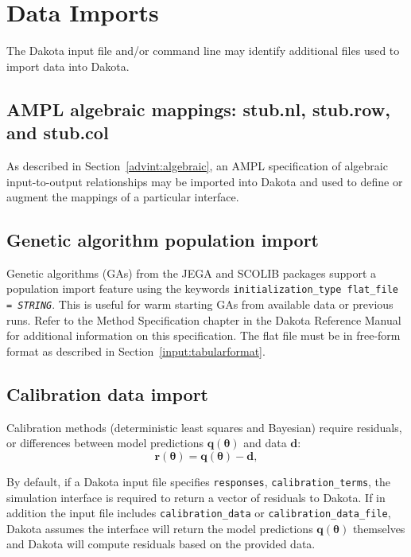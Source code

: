 \section{Data Imports}\label{input:import}

The Dakota input file and/or command line may identify additional
files used to import data into Dakota.

\subsection{AMPL algebraic mappings: stub.nl, stub.row, and stub.col}

As described in Section~\ref{advint:algebraic}, an AMPL
specification of algebraic input-to-output relationships may be
imported into Dakota and used to define or augment the mappings of a
particular interface.

\subsection{Genetic algorithm population import}

Genetic algorithms (GAs) from the JEGA and SCOLIB packages support a
population import feature using the keywords
\texttt{initialization\_type flat\_file = \emph{STRING}}.  This is
useful for warm starting GAs from available data or previous runs.
Refer to the Method Specification chapter in the Dakota Reference
Manual~\cite{RefMan} for additional information on this specification.
The flat file must be in free-form format as described in
Section~\ref{input:tabularformat}.

\subsection{Calibration data import}\label{input:calib_data}

Calibration methods (deterministic least squares and Bayesian) require
residuals, or differences between model predictions
$\mathbf{q}(\mathbf{\theta})$ and data $\mathbf{d}$:
\begin{equation}
  \mathbf{r}(\mathbf{\theta}) =  
  \mathbf{q}(\mathbf{\theta}) - \mathbf{d},
\end{equation}

By default, if a Dakota input file specifies \texttt{responses},
\texttt{calibration\_terms}, the simulation interface is required to
return a vector of residuals to Dakota.  If in addition the input file
includes \texttt{calibration\_data} or
\texttt{calibration\_data\_file}, Dakota assumes the interface will
return the model predictions $\mathbf{q}(\mathbf{\theta})$ themselves
and Dakota will compute residuals based on the provided data.

